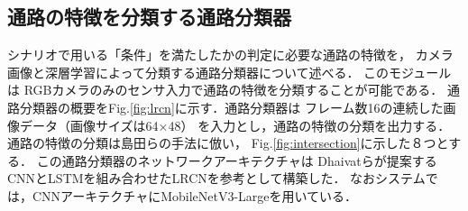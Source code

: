\documentclass{sice-si}
\begin{document}
\subsection{通路の特徴を分類する通路分類器}
シナリオで用いる「条件」を満たしたかの判定に必要な通路の特徴を，
カメラ画像と深層学習によって分類する通路分類器について述べる．
このモジュールは
RGBカメラのみのセンサ入力で通路の特徴を分類することが可能である．
通路分類器の概要をFig.\ref{fig:lrcn}に示す．通路分類器は
フレーム数16の連続した画像データ（画像サイズは64×48）
を入力とし，通路の特徴の分類を出力する．
通路の特徴の分類は島田らの手法\cite{shimada2020}に倣い，
Fig.\ref{fig:intersection}に示した８つとする．
この通路分類器のネットワークアーキテクチャは
Dhaivatらが提案するCNNとLSTMを組み合わせたLRCN\cite{lrcn}を参考として構築した．
なおシステムでは，CNNアーキテクチャにMobileNetV3-Large\cite{v3}を用いている．
\end{document}
